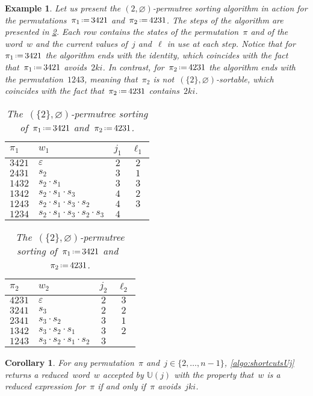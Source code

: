 \documentclass{amsart}
\newtheorem{corollary}[theorem]{Corollary}
\newtheorem{example}[theorem]{Example}
\newcommand{\eqdef}{\mbox{\,\raisebox{0.2ex}{\scriptsize\ensuremath{\mathrm:}}\ensuremath{=}\,}} %
\newcommand{\automatonU}{\mathbb{U}} %
\begin{document}
\begin{example}\label{exm:algo1}
	Let us present the $({2},\varnothing)$-permutree sorting algorithm in action for the permutations~$\pi_1 \eqdef 3421$ and~$\pi_2 \eqdef 4231$. The steps of the algorithm are presented in \cref{tab:algo1}. Each row contains the states of the permutation~$\pi$ and of the word~$w$ and the current values of~$j$ and~$\ell$ in use at each step. Notice that for~$\pi_1 \eqdef 3421$ the algorithm ends with the identity, which coincides with the fact that~$\pi_1 \eqdef 3421$ avoids~$2ki$. In contrast, for~$\pi_2 \eqdef 4231$ the algorithm ends with the permutation~$1243$, meaning that~$\pi_2$ is not~$(\{2\},\varnothing)$-sortable, which coincides with the fact that~$\pi_2 \eqdef 4231$ contains~$2ki$. 

	\begin{table}[h!]
		\begin{tabular}[t]{l|l|c|c}
			$\pi_1$ & $w_1$ & $j_1$ & $\ell_1$ \\
			\hline
			$3421$ & $\varepsilon$ & $2$ & $2$ \\
			$2431$ & $s_2$ & $3$ & $1$ \\
			$1432$ & $s_2 \cdot s_1$ & $3$ & $3$ \\
			$1342$ & $s_2 \cdot s_1 \cdot s_3$ & $4$ & $2$ \\
			$1243$ & $s_2 \cdot s_1 \cdot s_3 \cdot s_2$ & $4$ & $3$ \\
			$1234$ & $s_2 \cdot s_1 \cdot s_3 \cdot s_2 \cdot s_3$ & $4$ &
		\end{tabular}
		\qquad\qquad
		\begin{tabular}[t]{l|l|c|c}
			$\pi_2$ & $w_2$ & $j_2$ & $\ell_2$ \\
			\hline
			$4231$ & $\varepsilon$ & $2$ & $3$ \\
			$3241$ & $s_3$ & $2$ & $2$ \\
			$2341$ & $s_3 \cdot s_2$ & $3$ & $1$ \\
			$1342$ & $s_3 \cdot s_2 \cdot s_1$ & $3$ & $2$ \\
			$1243$ & $s_3 \cdot s_2 \cdot s_1 \cdot s_2$ & $3$ &
		\end{tabular}
	\caption{The~$(\{2\},\varnothing)$-permutree sorting of~$\pi_1 \eqdef 3421$ and~$\pi_2 \eqdef 4231$.}
	\label{tab:algo1}
	\end{table}
\end{example}               

\begin{corollary}\label{coro:algorithm}
For any permutation~$\pi$ and~$j \in \{2, \dots, n-1\}$, \cref{algo:shortcutsUj} returns a reduced~word~$w$ accepted by $\automatonU(j)$ with the property that~$w$ is a reduced expression for~$\pi$ if and only if~$\pi$ avoids~$jki$.
\end{corollary}
\end{document}
